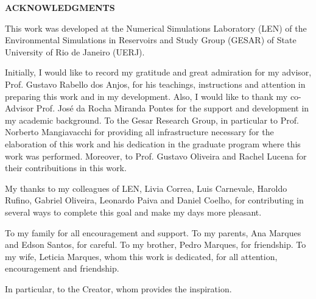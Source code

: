 \begin{center}
\textbf{ACKNOWLEDGMENTS}
\end{center}
$\!$\\

\medskip 
This work was developed at the Numerical Simulations Laboratory (LEN) of the Environmental Simulations in Reservoirs and Study Group (GESAR) of State University of Rio de Janeiro (UERJ).

\medskip 
Initially, I would like to record my gratitude and great admiration for my advisor, Prof. Gustavo Rabello dos Anjos, for his teachings, instructions and attention in preparing this work and in my development.
Also, I would like to thank my co-Advisor Prof. José da Rocha Miranda Pontes for the support and development in my academic background.
To the Gesar Research Group, in particular to Prof. Norberto Mangiavacchi for providing all infrastructure necessary for the elaboration of this work and his dedication in the graduate program where this work was performed. Moreover, to Prof. Gustavo Oliveira and Rachel Lucena for their contribuitions in this work.

\medskip 
My thanks to my colleagues of LEN, Livia Correa, Luis Carnevale, Haroldo Rufino, Gabriel Oliveira, Leonardo Paiva and Daniel Coelho, for contributing in several ways to complete this goal and make my days more pleasant.

\medskip 
To my family for all encouragement and support. To my parents, Ana Marques and Edson Santos, for careful. To my brother, Pedro Marques, for friendship. To my wife, Leticia Marques, whom this work is dedicated, for all attention, encouragement and friendship.

\medskip 
In particular, to the Creator, whom provides the inspiration.
